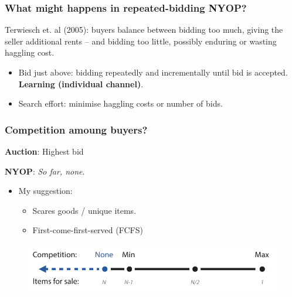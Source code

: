 \documentclass[mathserif,serif]{beamer}
\begin{document}
	\begin{frame}
		\frametitle{What might happens in repeated-bidding NYOP?}

		Terwiesch et. al (2005): buyers balance between bidding too much, giving the seller additional rents -- and bidding too little, possibly enduring or wasting haggling cost.
		\begin{itemize}
			\item Bid just above: bidding repeatedly and incrementally until bid is accepted. {\bf Learning (individual channel)}.
			\item Search effort: minimise haggling costs or number of bids.
		\end{itemize}

	\end{frame}
	
	
	\begin{frame}
		\frametitle{Competition amoung buyers?}

		{\bf Auction}: Highest bid
		
		\vspace{1\baselineskip}
		
		{\bf NYOP}: {\it So far, none}.
		\vspace{1\baselineskip}
		\begin{itemize}
			\item My suggestion: 
				\begin{itemize}
					\item Scares goods / unique items.
					\item First-come-first-served (FCFS)
				\end{itemize}
		\end{itemize}

		\begin{figure}[plain]
			\includegraphics[width=1\textwidth]{Figures/Competition-Items}
		\end{figure}

	\end{frame}
\end{document}
